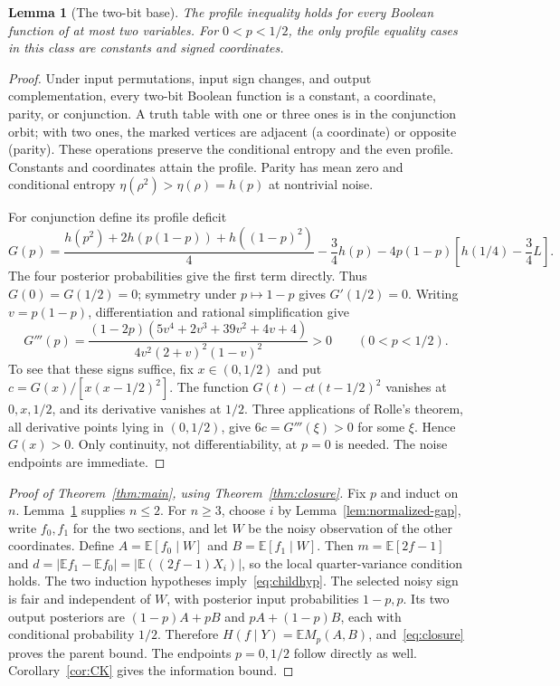 \documentclass[11pt]{article}
\newtheorem{lemma}[theorem]{Lemma}
\theoremstyle{remark}\newtheorem{remark}[theorem]{Remark}
\newcommand{\E}{\mathbb E}\newcommand{\PP}{\mathbb P}\newcommand{\dd}{\,\mathrm d}
\numberwithin{equation}{section}
\begin{document}
\begin{lemma}[The two-bit base]\label{lem:two-bit}
The profile inequality holds for every Boolean function of at most two
variables. For $0<p<1/2$, the only profile equality cases in this class
are constants and signed coordinates.
\end{lemma}
\begin{proof}
Under input permutations, input sign changes, and output complementation,
every two-bit Boolean function is a constant, a coordinate, parity, or
conjunction. A truth table with one or three ones is in the conjunction
orbit; with two ones, the marked vertices are adjacent (a coordinate) or
opposite (parity). These operations preserve the conditional entropy and the even
profile. Constants and coordinates attain the profile. Parity has mean zero
and conditional entropy $\eta(\rho^2)>\eta(\rho)=h(p)$ at nontrivial noise.

For conjunction define its profile deficit
\begin{equation}\label{eq:two-bit-deficit}
 G(p)=\frac{h(p^2)+2h(p(1-p))+h((1-p)^2)}4
       -\frac34h(p)-4p(1-p)
        \left[h(1/4)-\frac34L\right].
\end{equation}
The four posterior probabilities give the first term directly. Thus
$G(0)=G(1/2)=0$; symmetry under $p\mapsto1-p$ gives $G'(1/2)=0$.
Writing $v=p(1-p)$, differentiation and rational simplification give
\begin{equation}\label{eq:two-bit-third}
 G'''(p)=
 \frac{(1-2p)(5v^4+2v^3+39v^2+4v+4)}
 {4v^2(2+v)^2(1-v)^2}>0\qquad(0<p<1/2).
\end{equation}
To see that these signs suffice, fix $x\in(0,1/2)$ and put
$c=G(x)/[x(x-1/2)^2]$.
The function $G(t)-ct(t-1/2)^2$ vanishes at $0,x,1/2$, and its derivative
vanishes at $1/2$. Three applications of Rolle's theorem, all derivative
points lying in $(0,1/2)$, give $6c=G'''(\xi)>0$ for some $\xi$.
Hence $G(x)>0$. Only continuity, not differentiability, at $p=0$ is needed.
The noise endpoints are immediate.
\end{proof}

\begin{proof}[Proof of Theorem~\ref{thm:main}, using Theorem~\ref{thm:closure}]
Fix $p$ and induct on $n$. Lemma~\ref{lem:two-bit} supplies $n\le2$.
For $n\ge3$, choose $i$ by Lemma~\ref{lem:normalized-gap}, write $f_0,f_1$
for the two sections, and let $W$ be the noisy observation of the other
coordinates. Define $A=\E[f_0\mid W]$ and $B=\E[f_1\mid W]$.
Then $m=\E[2f-1]$ and
$d=|\E f_1-\E f_0|=|\E((2f-1)X_i)|$, so the local quarter-variance condition holds.
The two induction hypotheses imply~\eqref{eq:childhyp}.
The selected noisy sign is fair and independent of $W$, with posterior
input probabilities $1-p,p$. Its two output posteriors are
$(1-p)A+pB$ and $pA+(1-p)B$, each with conditional probability $1/2$.
Therefore $H(f\mid Y)=\E M_p(A,B)$, and~\eqref{eq:closure} proves the parent bound.
The endpoints $p=0,1/2$ follow directly as well. Corollary~\ref{cor:CK}
gives the information bound.
\end{proof}
\end{document}
